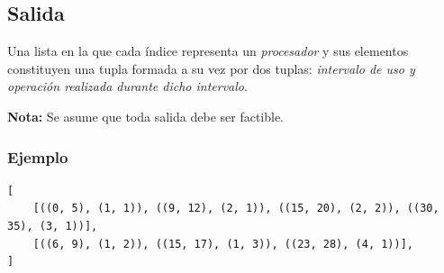 \documentclass[14pt]{extarticle}
\begin{document}
\subsection*{Salida}

Una lista en la que cada índice representa un \textit{procesador} y sus elementos constituyen una tupla formada a su vez por dos tuplas: \textit{intervalo de uso y operación realizada durante dicho intervalo}.

\textbf{Nota:} Se asume que toda salida debe ser factible.

\subsubsection*{Ejemplo}

\begin{verbatim}
[
    [((0, 5), (1, 1)), ((9, 12), (2, 1)), ((15, 20), (2, 2)), ((30, 35), (3, 1))],
    [((6, 9), (1, 2)), ((15, 17), (1, 3)), ((23, 28), (4, 1))],
]
\end{verbatim}
\end{document}
